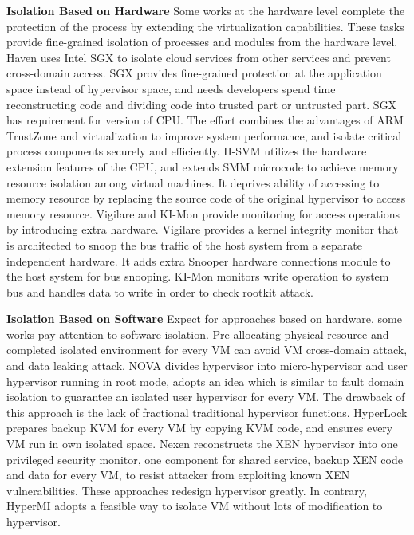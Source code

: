 \documentclass[conference]{IEEEtran}
\begin{document}
\textbf{Isolation Based on Hardware }
Some works at the hardware level complete the protection of the process by extending the virtualization capabilities. These tasks provide fine-grained isolation of processes and modules from the hardware level. Haven \cite{haven} uses Intel SGX\cite{Hoekstra13cuvillo,Mckeen2013Innovative} to isolate cloud services from other services and prevent cross-domain access. SGX provides fine-grained protection at the application space instead of hypervisor space, and needs developers spend time reconstructing code and dividing code into trusted part or untrusted part. SGX has requirement for version of CPU. The effort \cite{Cho2016Hardware} combines the advantages of ARM TrustZone and virtualization to improve system performance, and isolate critical process components securely and efficiently. H-SVM\cite{Jin2015H} utilizes the hardware extension features of the CPU, and extends SMM microcode to achieve memory resource isolation among virtual machines. It deprives ability of accessing to memory resource by replacing the source code of the original hypervisor to access memory resource. Vigilare\cite{Moon2012Vigilare} and KI-Mon \cite{Lee2013KI} provide monitoring for access operations by introducing extra hardware. Vigilare provides a kernel integrity monitor that is architected to snoop the bus traffic of the host system from a separate independent hardware. It adds extra Snooper hardware connections module to the host system for bus snooping. KI-Mon monitors write operation to system bus and handles data to write in order to check rootkit attack.

\textbf{Isolation Based on Software }
Expect for approaches based on hardware, some works\cite{nexen,Steinberg2010NOVA,hyperlock} pay attention to software isolation. Pre-allocating physical resource and completed isolated environment for every VM can avoid VM cross-domain attack, and data leaking attack. NOVA\cite{Steinberg2010NOVA} divides hypervisor into micro-hypervisor and user hypervisor running in root mode, adopts an idea which is similar to fault domain isolation to guarantee an isolated user hypervisor for every VM. The drawback of this approach is the lack of fractional traditional hypervisor functions. HyperLock \cite{hyperlock} prepares backup KVM for every VM by copying KVM code, and ensures every VM run in own isolated space. Nexen\cite{nexen} reconstructs the XEN hypervisor into one privileged security monitor, one component for shared service, backup XEN code and data for every VM, to resist attacker from exploiting known XEN vulnerabilities. These approaches redesign hypervisor greatly. In contrary, HyperMI adopts a feasible way to isolate VM without lots of modification to hypervisor. 
\end{document}
